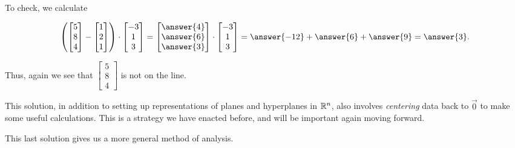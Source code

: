 \documentclass{ximera}
\begin{document}
\begin{example}
  To check, we calculate

  $$\left(\begin{bmatrix}
    5\\8\\4
  \end{bmatrix}-\begin{bmatrix}
    1\\2\\1
  \end{bmatrix}\right)\cdot \begin{bmatrix}
    -3\\1\\3
  \end{bmatrix}=\begin{bmatrix}
    \answer{4}\\\answer{6}\\\answer{3}
  \end{bmatrix}\cdot \begin{bmatrix}
    -3\\1\\3
  \end{bmatrix}=\answer{-12}+\answer{6}+\answer{9}=\answer{3}.$$

  Thus, again we see that $\begin{bmatrix}
    5\\8\\4
  \end{bmatrix}$ is not on the line.

  This solution, in addition to setting up representations of planes and hyperplanes in $\mathbb{R}^n$, also involves \emph{centering} data back to $\vec{0}$ to make some useful calculations. This is a strategy we have enacted before, and will be important again moving forward.


\end{example}

This last solution gives us a more general method of analysis.
\end{document}
